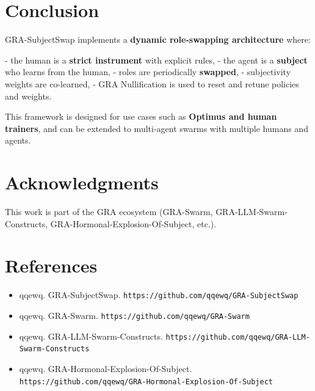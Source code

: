 \documentclass[11pt,a4paper]{article}
\begin{document}
\section{Conclusion}

GRA-SubjectSwap implements a \textbf{dynamic role-swapping architecture} where:

- the human is a \textbf{strict instrument} with explicit rules,
- the agent is a \textbf{subject} who learns from the human,
- roles are periodically \textbf{swapped},
- subjectivity weights are co-learned,
- GRA Nullification is used to reset and retune policies and weights.

This framework is designed for use cases such as \textbf{Optimus and human trainers}, and can be extended to multi-agent swarms with multiple humans and agents.

\section*{Acknowledgments}

This work is part of the GRA ecosystem (GRA-Swarm, GRA-LLM-Swarm-Constructs, GRA-Hormonal-Explosion-Of-Subject, etc.).

\section*{References}

\begin{itemize}
\item qqewq. GRA-SubjectSwap. \texttt{https://github.com/qqewq/GRA-SubjectSwap}
\item qqewq. GRA-Swarm. \texttt{https://github.com/qqewq/GRA-Swarm}
\item qqewq. GRA-LLM-Swarm-Constructs. \texttt{https://github.com/qqewq/GRA-LLM-Swarm-Constructs}
\item qqewq. GRA-Hormonal-Explosion-Of-Subject. \texttt{https://github.com/qqewq/GRA-Hormonal-Explosion-Of-Subject}
\end{itemize}
\end{document}
